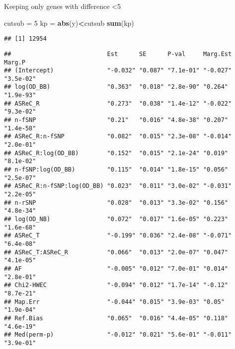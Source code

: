 \documentclass[]{article}
\newenvironment{Shaded}{\begin{snugshade}}{\end{snugshade}}
\newcommand{\KeywordTok}[1]{\textcolor[rgb]{0.13,0.29,0.53}{\textbf{#1}}}
\newcommand{\DecValTok}[1]{\textcolor[rgb]{0.00,0.00,0.81}{#1}}
\newcommand{\StringTok}[1]{\textcolor[rgb]{0.31,0.60,0.02}{#1}}
\newcommand{\OperatorTok}[1]{\textcolor[rgb]{0.81,0.36,0.00}{\textbf{#1}}}
\newcommand{\NormalTok}[1]{#1}
\begin{document}
Keeping only genes with difference \textless{}5

\begin{Shaded}
\begin{Highlighting}[]
\NormalTok{cutsub =}\StringTok{ }\DecValTok{5}
\NormalTok{kp =}\StringTok{ }\KeywordTok{abs}\NormalTok{(y)}\OperatorTok{<}\NormalTok{cutsub}
\KeywordTok{sum}\NormalTok{(kp)}
\end{Highlighting}
\end{Shaded}

\begin{verbatim}
## [1] 12954
\end{verbatim}

\begin{Shaded}
\end{Shaded}

\begin{verbatim}
##                           Est      SE      P-val     Marg.Est Marg.P   
## (Intercept)               "-0.032" "0.087" "7.1e-01" "-0.027" "3.5e-02"
## log(OD_BB)                "0.363"  "0.018" "2.8e-90" "0.264"  "1.9e-93"
## ASReC_R                   "0.273"  "0.038" "1.4e-12" "-0.022" "9.3e-02"
## n-fSNP                    "0.21"   "0.016" "4.8e-38" "0.207"  "1.4e-58"
## ASReC_R:n-fSNP            "0.082"  "0.015" "2.3e-08" "-0.014" "2.0e-01"
## ASReC_R:log(OD_BB)        "0.152"  "0.015" "2.1e-24" "0.019"  "8.1e-02"
## n-fSNP:log(OD_BB)         "0.115"  "0.014" "1.8e-15" "0.056"  "2.5e-07"
## ASReC_R:n-fSNP:log(OD_BB) "0.023"  "0.011" "3.0e-02" "-0.031" "2.2e-05"
## n-rSNP                    "0.028"  "0.013" "3.3e-02" "0.156"  "4.8e-34"
## log(OD_NB)                "0.072"  "0.017" "1.6e-05" "0.223"  "1.6e-68"
## ASReC_T                   "-0.199" "0.036" "2.4e-08" "-0.071" "6.4e-08"
## ASReC_T:ASReC_R           "0.066"  "0.013" "2.0e-07" "0.047"  "4.1e-05"
## AF                        "-0.005" "0.012" "7.0e-01" "0.014"  "2.8e-01"
## Chi2-HWEC                 "-0.094" "0.012" "1.7e-14" "-0.12"  "8.7e-21"
## Map.Err                   "-0.044" "0.015" "3.9e-03" "0.05"   "1.9e-04"
## Ref.Bias                  "0.065"  "0.016" "4.4e-05" "0.118"  "4.6e-19"
## Med(perm-p)               "-0.012" "0.021" "5.6e-01" "-0.011" "3.9e-01"
\end{verbatim}
\end{document}
